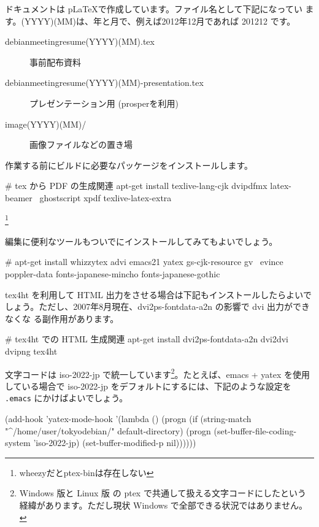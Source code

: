 \documentclass[mingoth,a4paper]{jsarticle}
\begin{document}
ドキュメントは p\LaTeX{}で作成しています。ファイル名として下記になってい
ます。(YYYY)(MM)は、年と月で、例えば2012年12月であれば 201212 です。

\begin{description}
 \item[debianmeetingresume(YYYY)(MM).tex]
	    事前配布資料
 \item[debianmeetingresume(YYYY)(MM)-presentation.tex]
	    プレゼンテーション用 (prosperを利用)
 \item[image(YYYY)(MM)/]
	    画像ファイルなどの置き場
\end{description}

作業する前にビルドに必要なパッケージをインストールします。

\begin{commandline}
# tex から PDF の生成関連
apt-get install texlive-lang-cjk dvipdfmx latex-beamer \
 ghostscript xpdf texlive-latex-extra 
\end{commandline}
\footnote{wheezyだとptex-binは存在しない}

編集に便利なツールもついでにインストールしてみてもよいでしょう。

\begin{commandline}
# apt-get install whizzytex advi emacs21 yatex gs-cjk-resource gv \
  evince poppler-data fonts-japanese-mincho fonts-japanese-gothic
\end{commandline}

tex4ht を利用して HTML 出力をさせる場合は下記もインストールしたらよいで
しょう。ただし、2007年8月現在、dvi2ps-fontdata-a2n の影響で dvi 出力ができなくな
る副作用があります。
\begin{commandline}
# tex4ht での HTML 生成関連
apt-get install dvi2ps-fontdata-a2n dvi2dvi dvipng tex4ht
\end{commandline}

文字コードは iso-2022-jp で統一しています\footnote{Windows 版と Linux 版
の ptex で共通して扱える文字コードにしたという経緯があります。ただし現状
Windows で全部できる状況ではありません。}。たとえば、emacs + yatex を使用
している場合で iso-2022-jp をデフォルトにするには、下記のような設定を
\texttt{.emacs} にかけばよいでしょう。

\begin{commandline}
(add-hook 'yatex-mode-hook
	  '(lambda () 
	     (progn 
	       (if (string-match "^/home/user/tokyodebian/" default-directory)
		   (progn (set-buffer-file-coding-system 'iso-2022-jp)
			  (set-buffer-modified-p nil))))))
\end{commandline}
\end{document}
